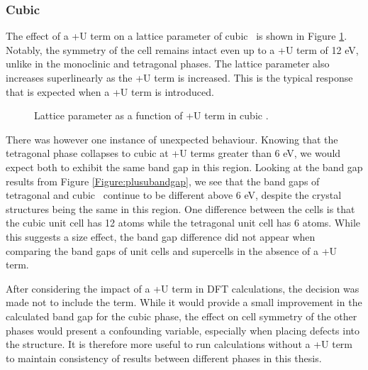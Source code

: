 \subsubsection{Cubic}

The effect of a +U term on a lattice parameter of cubic \zirconia\ is shown in Figure \ref{Figure:plusucubic}. Notably, the symmetry of the cell remains intact even up to a +U term of 12 eV, unlike in the monoclinic and tetragonal phases. The lattice parameter also increases superlinearly as the +U term is increased. This is the typical response that is expected when a +U term is introduced. 

\begin{figure}[ht] %
\begin{center}
		\caption{Lattice parameter as a function of +U term in cubic \zirconia .}
		\label{Figure:plusucubic}
	\end{center}
\end{figure}

There was however one instance of unexpected behaviour. Knowing that the tetragonal phase collapses to cubic at +U terms greater than 6 eV, we would expect both to exhibit the same band gap in this region. Looking at the band gap results from Figure \ref{Figure:plusubandgap}, we see that the band gaps of tetragonal and cubic \zirconia\ continue to be different above 6 eV, despite the crystal structures being the same in this region. One difference between the cells is that the cubic unit cell has 12 atoms while the tetragonal unit cell has 6 atoms. While this suggests a size effect, the band gap difference did not appear when comparing the band gaps of unit cells and supercells in the absence of a +U term. 

After considering the impact of a +U term in DFT calculations, the decision was made not to include the term. While it would provide a small improvement in the calculated band gap for the cubic phase, the effect on cell symmetry of the other phases would present a confounding variable, especially when placing defects into the structure. It is therefore more useful to run calculations without a +U term to maintain consistency of results between different phases in this thesis.